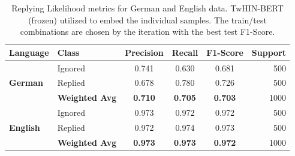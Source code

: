 \begin{table}[ht]
	\renewcommand{\arraystretch}{1.15}
	\centering
	\begin{tabular}{ll | ccc | r}
		\hline
		\textbf{Language} & 
        \textbf{Class} & 
        \textbf{Precision} & 
        \textbf{Recall} & 
        \textbf{F1-Score} & 
        \textbf{Support} \\
		\hline
		\multirow{3}{*}{\textbf{German}} & 
        Ignored
        & 0.741
        & 0.630
        & 0.681
        & 500
        \\
		& 
        Replied        
        & 0.678              
        & 0.780           
        & 0.726             
        & 500
        \\
        \cline{2-6}
		& 
        \textbf{Weighted Avg}   
        & \textbf{0.710}              
        & \textbf{0.705}           
        & \textbf{0.703}             
        & 1000             
        \\
		\hline
		\multirow{3}{*}{\textbf{English}} & 
        Ignored        
        & 0.973              
        & 0.972          
        & 0.972             
        & 500
        \\
        & 
        Replied        
        & 0.972              
        & 0.974           
        & 0.973             
        & 500
        \\
        \cline{2-6}
		& 
        \textbf{Weighted Avg}   
        & \textbf{0.973}              
        & \textbf{0.973}           
        & \textbf{0.972}             
        & 1000
        \\
		\hline
	\end{tabular}
	\caption{
        Replying Likelihood metrics for German and English data. TwHIN-BERT \citep{zhang2023twhin} (frozen) utilized to embed the individual samples. The train/test combinations are chosen by the iteration with the best test  F1-Score.
    }
	\label{tab:results:probability:test}
\end{table}